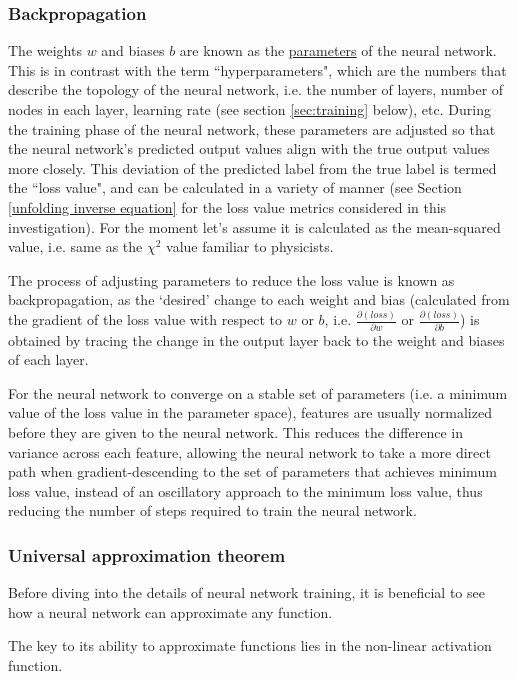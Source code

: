 \documentclass[a4paper, 12pt]{article}
\begin{document}
\subsubsection{Backpropagation}
    The weights $w$ and biases $b$ are known as the \underline{parameters} of the neural network. This is in contrast with the term ``hyperparameters", which are the numbers that describe the topology of the neural network, i.e. the number of layers, number of nodes in each layer, learning rate (see section \ref{sec:training} below), etc. During the training phase of the neural network, these parameters are adjusted so that the neural network's predicted output values align with the true output values more closely. This deviation of the predicted label from the true label is termed the ``loss value", and can be calculated in a variety of manner (see Section \ref{unfolding inverse equation} for the loss value metrics considered in this investigation). For the moment let's assume it is calculated as the mean-squared value, i.e. same as the $\chi^2$ value familiar to physicists.

    The process of adjusting parameters to reduce the loss value is known as backpropagation, as the `desired' change to each weight and bias (calculated from the gradient of the loss value with respect to $w$ or $b$, i.e. $\frac{\partial (loss)}{\partial w}$ or $\frac{\partial (loss)}{\partial b}$) is obtained by tracing the change in the output layer back to the weight and biases of each layer.

    For the neural network to converge on a stable set of parameters (i.e. a minimum value of the loss value in the parameter space), features are usually normalized before they are given to the neural network. This reduces the difference in variance across each feature, allowing the neural network to take a more direct path when gradient-descending to the set of parameters that achieves minimum loss value, instead of an oscillatory approach to the minimum loss value\cite{AndrewNgNormalisation}, thus reducing the number of steps required to train the neural network.

\subsubsection{Universal approximation theorem}
    Before diving into the details of neural network training, it is beneficial to see how a neural network can approximate any function.

    The key to its ability to approximate functions lies in the non-linear activation function. 
\end{document}
